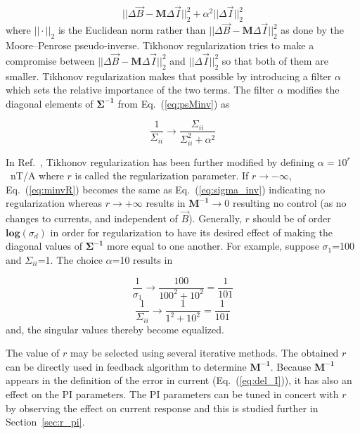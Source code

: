 \begin{equation}\label{eq:tikhonov}
    ||\Delta\Vec{B}-\bm{M}\Delta\Vec{I}||_2^2+{\alpha}^2||\Delta\Vec{I}||_2^2
\end{equation}
where $||\cdot ||_2$ is the Euclidean norm rather than $||\Delta\Vec{B}-\bm{M}\Delta\Vec{I}||_2^2$ as done by the Moore--Penrose pseudo-inverse. Tikhonov regularization tries to make a compromise between $||\Delta\Vec{B}-\bm{M}\Delta\Vec{I}||_2^2$ and $||\Delta\Vec{I}||_2^2$ so that both of them are smaller. Tikhonov regularization makes that possible by introducing a filter $\alpha$ which sets the relative importance of the two terms. The filter $\alpha$ modifies the diagonal elements of $\bm{\Sigma^{-1}}$ from Eq.~(\ref{eq:psMinv}) as

\begin{equation}\label{eq:minvR}
    \frac{1}{\Sigma_{ii}} \rightarrow \frac{\Sigma_{ii}}{\Sigma_{ii}^2+\alpha^2} 
\end{equation}

In Ref.~\cite{bea}, Tikhonov regularization has been further modified by defining $\alpha=10^r$~nT/A where $r$ is called the regularization parameter. If  $r \rightarrow - \infty$, Eq.~(\ref{eq:minvR}) becomes the same as Eq.~(\ref{eq:sigma_inv}) indicating no regularization whereas $r \rightarrow + \infty$ results in $\bm{M^{-1}} \rightarrow 0$ resulting no control (as no changes to currents, and independent of $\Vec{B}$). Generally, $r$ should be of order $\mathbf{log}(\sigma_{d})$ in order for regularization to have its desired effect of making the diagonal values of $\bm{\Sigma^{-1}}$ more equal to one another. For example, suppose $\sigma_1$=100 and $\Sigma_{ii}$=1. The choice $\alpha$=10 results in

\begin{equation*}
    \frac{1}{\sigma_1} \rightarrow \frac{100}{100^2+10^2}=\frac{1}{101} 
\end{equation*}
\begin{equation*}
    \frac{1}{\Sigma_{ii}} \rightarrow \frac{1}{1^2+10^2}=\frac{1}{101} 
\end{equation*}
and, the singular values thereby become equalized.

The value of $r$ may be selected using several iterative methods. The obtained $r$ can be directly used in feedback algorithm to determine $\bm{M^{-1}}$. Because $\bm{M^{-1}}$ appears in the definition of the error in current (Eq.~(\ref{eq:del_I})), it has also an effect on the PI parameters. The PI parameters can be tuned in concert with $r$ by observing the effect on current response and this is studied further in Section~\ref{sec:r_pi}.


